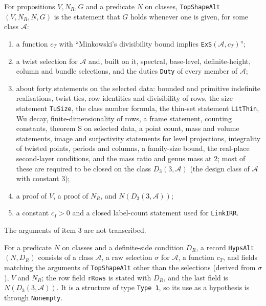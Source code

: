 \begin{definition}\label{fam:top-shape-alt}
For propositions $V,N_R,G$ and a predicate $N$ on classes, \texttt{TopShapeAlt}$(V,N_R,N,G)$ is the statement that $G$ holds whenever one is given, for some class $\mathcal A$:
\begin{enumerate}
\item a function $c_T$ with ``Minkowski's divisibility bound implies \texttt{ExS}$(\mathcal A,c_T)$'';
\item a twist selection for $\mathcal A$ and, built on it, spectral, base-level, definite-height, column and bundle selections, and the duties \texttt{Duty} of every member of $\mathcal A$;
\item about forty statements on the selected data: bounded and primitive indefinite realisations, twist ties, row identities and divisibility of rows, the size statement \texttt{TuSize}, the class number formula, the thin-set statement \texttt{LitThin}, Wu decay, finite-dimensionality of rows, a frame statement, counting constants, theorem S on selected data, a point count, mass and volume statements, image and surjectivity statements for level projections, integrality of twisted points, periods and columns, a family-size bound, the real-place second-layer conditions, and the mass ratio and genus mass at $2$; most of these are required to be closed on the class $D_3(3,\mathcal A)$ (the design class of $\mathcal A$ with constant $3$);
\item a proof of $V$, a proof of $N_R$, and $N(D_3(3,\mathcal A))$;
\item a constant $c_I>0$ and a closed label-count statement used for \texttt{LinkIRR}.
\end{enumerate}
The arguments of item 3 are not transcribed.
\end{definition}

\begin{definition}\label{fam:hyps-alt}
For a predicate $N$ on classes and a definite-side condition $D_R$, a record \texttt{HypsAlt}$(N,D_R)$ consists of a class $\mathcal A$, a raw selection $\sigma$ for $\mathcal A$, a function $c_T$, and fields matching the arguments of \texttt{TopShapeAlt} other than the selections (derived from $\sigma$), $V$ and $N_R$; the row field \texttt{rRows} is stated with $D_R$, and the last field is $N(D_3(3,\mathcal A))$. It is a structure of type \texttt{Type 1}, so its use as a hypothesis is through \texttt{Nonempty}.
\end{definition}

